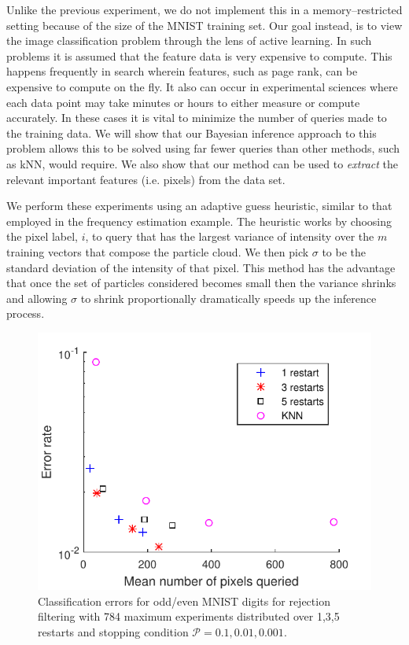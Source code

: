 \documentclass[twoside]{article}
\begin{document}
Unlike the previous experiment, we do not implement this in a memory--restricted
setting because of the size of the MNIST training set.
Our goal instead, is to view the image classification problem through the lens of active learning.  In such
problems it is assumed that the feature data is very expensive to compute.  This happens frequently
in search wherein features, such as page rank, can be expensive to compute on the fly.  It also can
occur in experimental sciences where each data point may take minutes or hours to either measure
or compute accurately.  In these cases it is vital to minimize the number of queries made to the training
data.  We will show that our Bayesian inference approach to this problem allows this to be solved using
far fewer queries than other methods, such as kNN, would require.  We also show that our method can
be used to \emph{extract} the relevant important features (i.e. pixels) from the data set.

We perform these experiments using an adaptive guess heuristic, similar to that employed in the frequency estimation example.
The heuristic works by choosing the pixel label, $i$, to query that has the largest variance of intensity
over the $m$ training vectors that compose the particle cloud.  We then pick $\sigma$ to be the standard
deviation of the intensity of that pixel.  This method has the advantage that once the set of particles
considered becomes small then the variance shrinks and allowing $\sigma$ to shrink proportionally dramatically
speeds up the inference process.  

\begin{figure}
\includegraphics[width=\columnwidth]{ErrorPlot.pdf}
\caption{Classification errors for odd/even MNIST digits for rejection filtering with 784 maximum experiments distributed over 1,3,5 restarts and stopping condition $\mathcal{P}=0.1,0.01,0.001$.}\label{fig:errorplot}
\end{figure}
\end{document}
